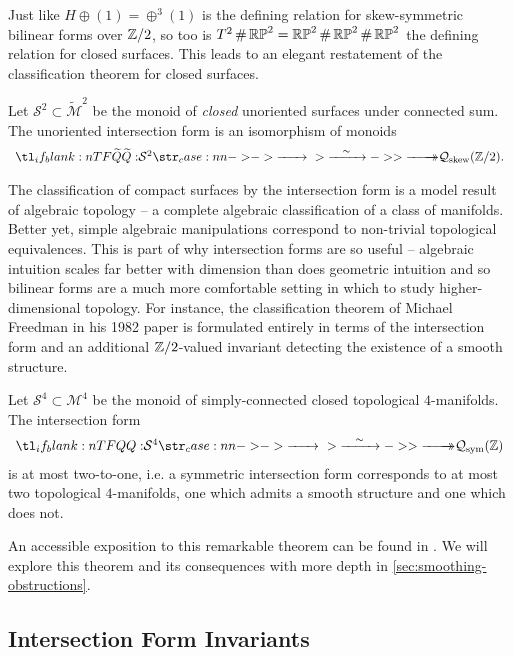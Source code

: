 Just like $H\oplus (1)= \oplus^3 (1)$ is the defining relation for skew-symmetric bilinear forms over $\mathbb{Z}/2$, so too is $T^2\,\#\, \mathbb{RP}^2 = \mathbb{RP}^2\,\#\,\mathbb{RP}^2\,\#\,\mathbb{RP}^2$ the defining relation for closed surfaces. This leads to an elegant restatement of the classification theorem for closed surfaces.

\begin{theorem}
	Let $\mathcal{S}^2\subset \widetilde{\mathcal{M}}^2$ be the monoid of \textit{closed} unoriented surfaces under connected sum. The unoriented intersection form is an isomorphism of monoids
	\[
		\lkxfunc{\widetilde{Q}}{\mathcal{S}^2}{\mathcal{Q}_{\mathrm{skew}}(\Z/2).}
	\]
\end{theorem}

The classification of compact surfaces by the intersection form is a model result of algebraic topology -- a complete algebraic classification of a class of manifolds. Better yet, simple algebraic manipulations correspond to non-trivial topological equivalences. This is part of why intersection forms are so useful -- algebraic intuition scales far better with dimension than does geometric intuition and so bilinear forms are a much more comfortable setting in which to study higher-dimensional topology. For instance, the classification theorem of Michael Freedman in his 1982 paper \cite{freedman1982manifold} is formulated entirely in terms of the intersection form and an additional $\mathbb{Z}/2$-valued invariant detecting the existence of a smooth structure.

\begin{theorem}[Freedman, 1982] Let $\mathcal{S}^4\subset \mathcal{M}^4$ be the monoid of simply-connected closed topological $4$-manifolds. The intersection form
	\[
		\lkxfunc{Q}{\mathcal{S}^4}{\mathcal{Q}_{\mathrm{sym}}(\Z)}
	\]
	is at most two-to-one, i.e. a symmetric intersection form corresponds to at most two topological $4$-manifolds, one which admits a smooth structure and one which does not.
\end{theorem}
An accessible exposition to this remarkable theorem can be found in \cite{behrens2021discembedding}. We will explore this theorem and its consequences with more depth in \cref{sec:smoothing-obstructions}.

\subsection{Intersection Form Invariants}\label{sec:intersection-form-invarians}


